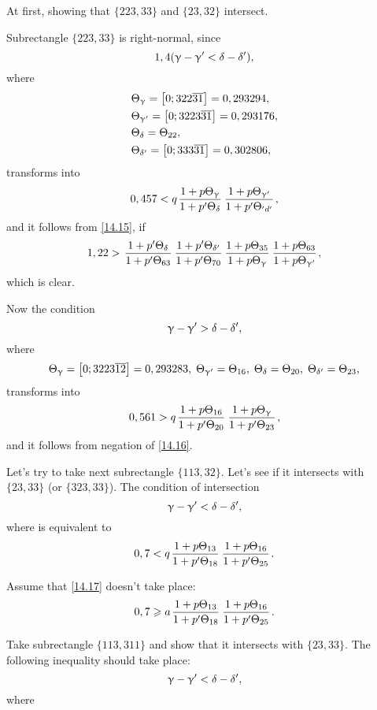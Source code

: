 At first, showing that $\{223, 33\}$ and $\{23, 32\}$ intersect.

Subrectangle $\{223, 33\}$ is right-normal, since
\begin{equation*}
	1,4 (\upgamma - \upgamma' < \delta - \delta'),
\end{equation*}
where
\begin{align*}
	&\Theta_{\upgamma} = \left[0; 322 \overline{31}\right] = 0,293294,\\
	&\Theta_{\upgamma'} = \left[0; 3223\overline{31}\right] = 0,293176,\\
	&\Theta_{\delta} = \Theta_{22},\\
	&\Theta_{\delta'} = \left[0;333\overline{31}\right] = 0,302806,
\end{align*}
transforms into
\begin{equation*}
	0,457 < q \up{\g}{\d} \up{\g'}{'d'},
\end{equation*}
and it follows from \ref{14.15}, if
\begin{equation*}
	1,22 > \pp{\d}{63} \pp{\d'}{70} \uu{35}{\g} \uu{63}{\g'},
\end{equation*}
which is clear.

Now the condition
\begin{equation*}
	\upgamma - \upgamma' > \delta - \delta',
\end{equation*}
where
\begin{equation*}
	\Theta_{\upgamma} = \left[0; 3223\overline{12}\right] = 0,293283,\; \Theta_{\upgamma'} = \Theta_{16},\; \Theta_{\delta} = \Theta_{20},\; \Theta_{\delta'} = \Theta_{23},
\end{equation*}
transforms into
\begin{equation*}
	0,561 > q \up{16}{20} \up{\g}{23},
\end{equation*}
and it follows from negation of \ref{14.16}.

Let's try to take next subrectangle $\{113, 32\}$.
Let's see if it intersects with $\{23, 33\}$ (or $\{323, 33\}$).
The condition of intersection
\begin{equation*}
	\upgamma - \upgamma' < \delta - \delta',
\end{equation*}
where
is equivalent to
\begin{equation}\label{14.17}
	0,7 < q \up{13}{18} \up{16}{25}.
\end{equation}

Assume that \ref{14.17} doesn't take place:
\begin{equation}\label{14.18}
	0,7 \geqslant a \up{13}{18} \up{16}{25}.
\end{equation}

Take subrectangle $\{113, 311\}$ and show that it intersects with $\{23, 33\}$.
The following inequality should take place:
\begin{equation*}
	\upgamma - \upgamma' < \delta - \delta',
\end{equation*}
where

